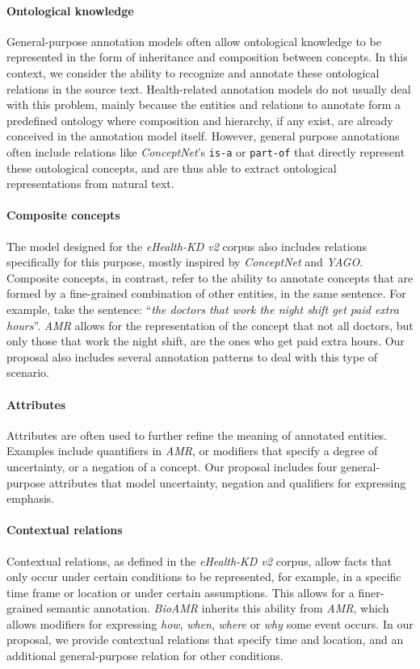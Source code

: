   \paragraph{Ontological knowledge}
  General-purpose annotation models often allow ontological knowledge to be represented in the form of inheritance and composition between concepts. In this context, we consider the ability to recognize and annotate  these ontological relations in the source text. Health-related annotation models do not usually deal with this problem, mainly because the entities and relations to annotate form a predefined ontology where composition and hierarchy, if any exist, are already conceived in the annotation model itself. However, general purpose annotations often include relations like \textit{ConceptNet}'s \texttt{is-a} or \texttt{part-of} that directly represent these ontological concepts, and are thus able to extract ontological representations from natural text.

  \paragraph{Composite concepts}
  The model designed for the \textit{eHealth-KD v2} corpus also includes relations specifically for this purpose, mostly inspired by \textit{ConceptNet} and \textit{YAGO}.
  Composite concepts, in contrast, refer to the ability to annotate concepts that are formed by a fine-grained combination of other entities, in the same sentence. For example, take the sentence: ``\textit{the doctors that work the night shift get paid extra hours}''. \textit{AMR} allows for the representation of the concept that not all doctors, but only those that work the night shift, are the ones who get paid extra hours. Our proposal also includes several annotation patterns to deal with this type of scenario.

  \paragraph{Attributes}
  Attributes are often used to further refine the meaning of annotated entities. Examples include quantifiers in \textit{AMR}, or modifiers that specify a degree of uncertainty, or a negation of a concept. Our proposal includes four general-purpose attributes that model uncertainty, negation and qualifiers for expressing emphasis.

  \paragraph{Contextual relations}
  Contextual relations, as defined in the \textit{eHealth-KD v2} corpus, allow  facts that only occur
  under certain conditions to be represented, for example, in a specific time frame or location or under certain assumptions. This allows for a finer-grained semantic annotation. \textit{BioAMR} inherits this ability from \textit{AMR}, which allows modifiers for expressing \textit{how}, \textit{when}, \textit{where} or \textit{why} some event occurs. In our proposal, we provide contextual relations that specify time and location, and an additional general-purpose relation for other conditions.

